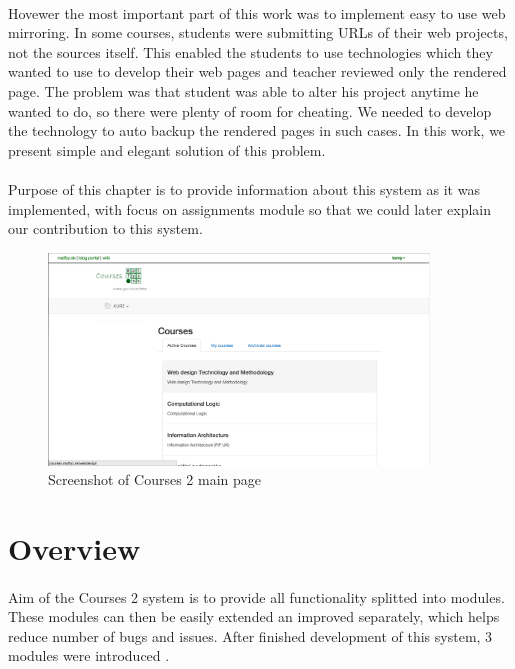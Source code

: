 \paragraph{}
Hovewer the most important part of this work was to implement easy to use web mirroring. In some courses, students were submitting URLs of their web projects, not the sources itself. This enabled the students to use technologies which they wanted to use to develop their web pages and teacher reviewed only the rendered page. The problem was that student was able to alter his project anytime he wanted to do, so there were plenty of room for cheating. We needed to develop the technology to auto backup the rendered pages in such cases. In this work, we present simple and elegant solution of this problem.


\paragraph{}
Purpose of this chapter is to provide information about this system as it was implemented, with focus on assignments module so that we could later explain our contribution to this system.
 
\begin{figure}[t]
    \centering
    \includegraphics[width=0.9\textwidth]{courses/screenshot.png}
    \caption{Screenshot of Courses 2 main page}
    \label{courses_main}
\end{figure}


\section{Overview}
\paragraph{}
Aim of the Courses 2 system is to provide all functionality splitted into modules. These modules can then be easily extended an improved separately, which helps reduce number of bugs and issues. After finished development of this system, 3 modules were introduced \cite{culik}.


